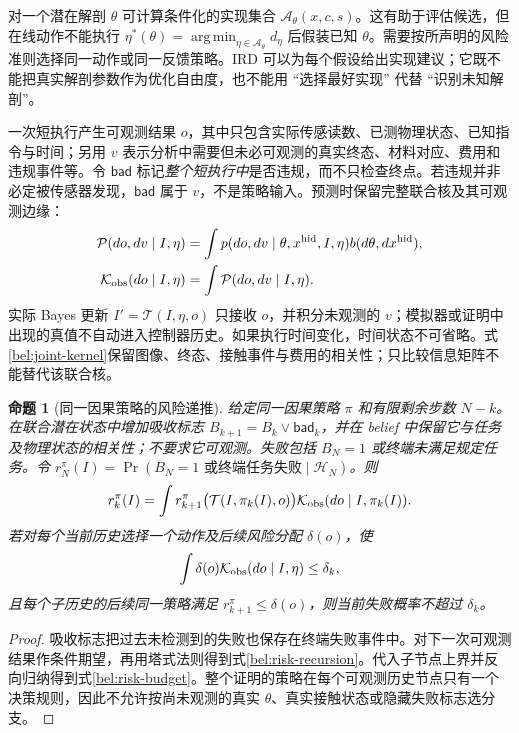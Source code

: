 \documentclass[11pt,a4paper]{article}
\numberwithin{equation}{section}
\newtheorem{proposition}[theorem]{命题}
\theoremstyle{definition}
\DeclareMathOperator{\argmin}{arg\,min}
\begin{document}
对一个潜在解剖 $\theta$ 可计算条件化的实现集合 $\mathcal A_\theta(x,c,s)$。这有助于评估候选，但在线动作不能执行
$\eta^*(\theta)=\argmin_{\eta\in\mathcal A_\theta}d_\eta$ 后假装已知 $\theta$。需要按所声明的风险准则选择同一动作或同一反馈策略。IRD 可以为每个假设给出实现建议；它既不能把真实解剖参数作为优化自由度，也不能用 ``选择最好实现'' 代替 ``识别未知解剖''。

一次短执行产生可观测结果 $o$，其中只包含实际传感读数、已测物理状态、已知指令与时间；另用 $v$ 表示分析中需要但未必可观测的真实终态、材料对应、费用和违规事件等。令 $\mathsf{bad}$ 标记\emph{整个短执行中}是否违规，而不只检查终点。若违规并非必定被传感器发现，$\mathsf{bad}$ 属于 $v$，不是策略输入。预测时保留完整联合核及其可观测边缘：
\begin{align}
 \mathcal P(do,dv\mid I,\eta)
 &=\int p(do,dv\mid\theta,x^{\rm hid},I,\eta)
 b(d\theta,dx^{\rm hid}),\\
 \mathcal K_{\rm obs}(do\mid I,\eta)
 &=\int\mathcal P(do,dv\mid I,\eta).
 \label{bel:joint-kernel}
\end{align}
实际 Bayes 更新 $I'=\mathcal T(I,\eta,o)$ 只接收 $o$，并积分未观测的 $v$；模拟器或证明中出现的真值不自动进入控制器历史。如果执行时间变化，时间状态不可省略。式\eqref{bel:joint-kernel}保留图像、终态、接触事件与费用的相关性；只比较信息矩阵不能替代该联合核。

\begin{proposition}[同一因果策略的风险递推]
\label{bel:prop-risk}
给定同一因果策略 $\pi$ 和有限剩余步数 $N-k$。在联合潜在状态中增加吸收标志 $B_{k+1}=B_k\lor\mathsf{bad}_k$，并在 belief 中保留它与任务及物理状态的相关性；不要求它可观测。失败包括 $B_N=1$ 或终端未满足规定任务。令
$r_N^\pi(I)=\Pr(B_N=1\text{ 或终端任务失败}\mid\mathcal H_N)$。则
\begin{equation}
 r_k^\pi(I)=\int
 r_{k+1}^\pi\bigl(\mathcal T(I,\pi_k(I),o)\bigr)
 \mathcal K_{\rm obs}(do\mid I,\pi_k(I)).
 \label{bel:risk-recursion}
\end{equation}
若对每个当前历史选择一个动作及后续风险分配 $\delta(o)$，使
\begin{equation}
 \int\delta(o)\mathcal K_{\rm obs}(do\mid I,\eta)\le\delta_k,
 \label{bel:risk-budget}
\end{equation}
且每个子历史的后续同一策略满足 $r_{k+1}^\pi\le\delta(o)$，则当前失败概率不超过 $\delta_k$。
\end{proposition}
\begin{proof}
吸收标志把过去未检测到的失败也保存在终端失败事件中。对下一次可观测结果作条件期望，再用塔式法则得到式\eqref{bel:risk-recursion}。代入子节点上界并反向归纳得到式\eqref{bel:risk-budget}。整个证明的策略在每个可观测历史节点只有一个决策规则，因此不允许按尚未观测的真实 $\theta$、真实接触状态或隐藏失败标志选分支。
\end{proof}
\end{document}
